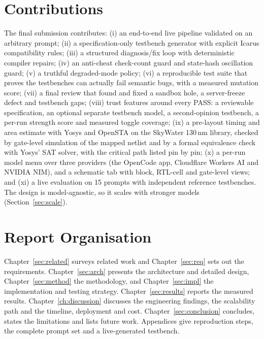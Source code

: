 \section{Contributions}
The final submission contributes: (i) an end-to-end live pipeline validated on an
arbitrary prompt; (ii) a specification-only testbench generator with explicit Icarus
compatibility rules; (iii) a structured diagnosis/fix loop with deterministic
compiler repairs; (iv) an anti-cheat check-count guard and state-hash oscillation
guard; (v) a truthful degraded-mode policy; (vi) a reproducible test suite that
proves the testbenches can actually fail semantic bugs, with a measured mutation score; (vii) a final review that found and fixed a sandbox hole, a server-freeze defect and testbench gaps; (viii) trust features around every PASS: a reviewable specification, an optional separate testbench model, a second-opinion testbench, a per-run strength score and measured toggle coverage; (ix) a pre-layout timing and area estimate with Yosys and OpenSTA on the SkyWater 130\,nm library, checked by gate-level simulation of the mapped netlist and by a formal equivalence check with Yosys' SAT solver, with the critical path listed pin by pin; (x) a per-run model menu over three providers (the OpenCode app, Cloudflare Workers AI and NVIDIA NIM), and a schematic tab with block, RTL-cell and gate-level views; and (xi) a live evaluation on 15 prompts with independent reference testbenches. The design is model-agnostic, so it scales with stronger models (Section~\ref{sec:scale}).

\section{Report Organisation}
Chapter~\ref{sec:related} surveys related work and Chapter~\ref{sec:req} sets out the requirements. Chapter~\ref{sec:arch} presents the architecture and detailed design, Chapter~\ref{sec:method} the methodology, and Chapter~\ref{sec:impl} the implementation and testing strategy. Chapter~\ref{sec:results} reports the measured results. Chapter~\ref{ch:discussion} discusses the engineering findings, the scalability path and the timeline, deployment and cost. Chapter~\ref{sec:conclusion} concludes, states the limitations and lists future work. Appendices give reproduction steps, the complete prompt set and a live-generated testbench.
